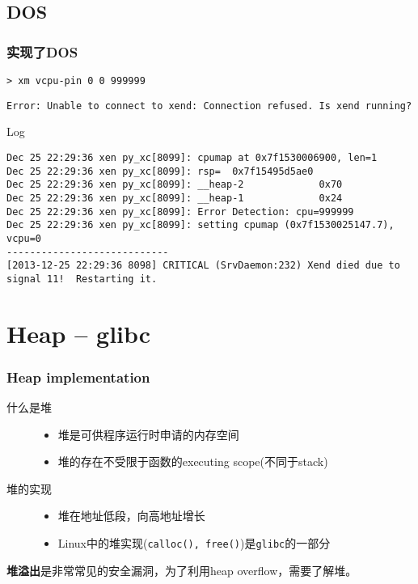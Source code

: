 \documentclass[t]{beamer}
\begin{document}
\subsection{DOS}
\begin{frame}[fragile]
\frametitle{\kaishu 实现了DOS}
\begin{verbatim}
> xm vcpu-pin 0 0 999999
\end{verbatim}
{\scriptsize\begin{verbatim}
Error: Unable to connect to xend: Connection refused. Is xend running?
\end{verbatim}}

Log\par

{\tiny
\begin{verbatim}
Dec 25 22:29:36 xen py_xc[8099]: cpumap at 0x7f1530006900, len=1
Dec 25 22:29:36 xen py_xc[8099]: rsp=  0x7f15495d5ae0
Dec 25 22:29:36 xen py_xc[8099]: __heap-2             0x70
Dec 25 22:29:36 xen py_xc[8099]: __heap-1             0x24
Dec 25 22:29:36 xen py_xc[8099]: Error Detection: cpu=999999
Dec 25 22:29:36 xen py_xc[8099]: setting cpumap (0x7f1530025147.7), vcpu=0
----------------------------
[2013-12-25 22:29:36 8098] CRITICAL (SrvDaemon:232) Xend died due to signal 11!  Restarting it.
\end{verbatim}}
\end{frame}

\section{Heap -- glibc}
\begin{frame}[fragile]
\frametitle{Heap implementation}
\begin{description}
\item[什么是堆]
\begin{itemize}
\item 堆是可供程序运行时申请的内存空间
\item 堆的存在不受限于函数的executing scope(不同于stack)
\end{itemize}
\item[堆的实现]
\begin{itemize}
  \item 堆在地址低段，向高地址增长
  \item Linux中的堆实现(\texttt{calloc(), free()})是\texttt{glibc}的一部分
\end{itemize}
\end{description}
\textbf{堆溢出}是非常常见的安全漏洞，为了利用heap overflow，需要了解堆。
\end{frame}
\end{document}
